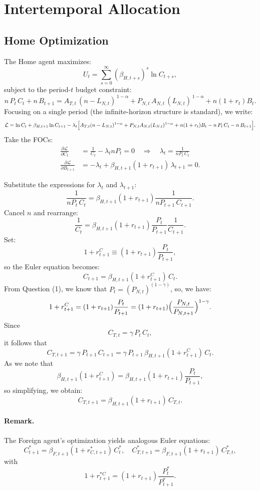 \documentclass[a4paper,12pt]{article} %
\theoremstyle{nonitalic}
\begin{document}
\section{Intertemporal Allocation}

\subsection*{Home Optimization}
The Home agent maximizes:
\[
U_t = \sum_{s=0}^{\infty} (\beta_{H,t+s})^s \ln C_{t+s},
\]
subject to the period-$ t $ budget constraint:
\[
n\,P_t\,C_t + n\,B_{t+1} = A_{T,t}\,(n-L_{N,t})^{\,1-\alpha} + P_{N,t}\,A_{N,t}\,(L_{N,t})^{\,1-\alpha} + n(1+r_t)B_t.
\]
Focusing on a single period (the infinite-horizon structure is standard), we write:
\[
\mathcal{L} = \ln C_t + \beta_{H,t+1}\ln C_{t+1} - \lambda_t \Bigl[A_{T,t}(n-L_{N,t})^{1-\alpha} + P_{N,t}A_{N,t}(L_{N,t})^{1-\alpha} + n(1+r_t)B_t - n\,P_t\,C_t - n\,B_{t+1}\Bigr].
\]
Take the FOCs:
\begin{align*}
    \frac{\partial \mathcal{L}}{\partial C_t} &= \frac{1}{C_t} - \lambda_t nP_t = 0 \quad \Rightarrow \quad \lambda_t = \frac{1}{nP_t\,C_t} \\
    \frac{\partial \mathcal{L}}{\partial B_{t+1}} &= -\lambda_t + \beta_{H,t+1}(1+r_{t+1})\,\lambda_{t+1} = 0.
\end{align*}

Substitute the expressions for \(\lambda_t\) and \(\lambda_{t+1}\):
\[
\frac{1}{nP_t\,C_t} = \beta_{H,t+1}(1+r_{t+1})\frac{1}{nP_{t+1}\,C_{t+1}}.
\]
Cancel \(n\) and rearrange:
\[
\frac{1}{C_t} = \beta_{H,t+1}(1+r_{t+1})\frac{P_t}{P_{t+1}}\frac{1}{C_{t+1}}.
\]
Set:
\[
1 + r_{t+1}^C \equiv (1+r_{t+1})\frac{P_t}{P_{t+1}},
\]
so the Euler equation becomes:
\[
\boxed{C_{t+1} = \beta_{H,t+1}(1+r_{t+1}^C)\, C_t.}
\]
From Question (1), we know that $P_t = (P_{N,t})^{(1-\gamma)}$,
so, we have:
\[
1 + r_{t+1}^C = (1+r_{t+1})\frac{P_t}{P_{t+1}} = (1+r_{t+1})\Bigl(\frac{P_{N,t}}{P_{N,t+1}}\Bigr)^{1-\gamma}.
\]
Since
\[
C_{T,t} = \gamma\,P_t\,C_t,
\]
it follows that
\[
C_{T,t+1} = \gamma\,P_{t+1}\,C_{t+1} = \gamma\,P_{t+1}\,\beta_{H,t+1}(1+r_{t+1}^C)\,C_t.
\]
As we note that
\[
\beta_{H,t+1}(1+r_{t+1}^C) = \beta_{H,t+1}(1+r_{t+1})\frac{P_t}{P_{t+1}},
\]
so simplifying, we obtain:
\[
\boxed{C_{T,t+1} = \beta_{H,t+1}(1+r_{t+1})\, C_{T,t}.}
\]

\paragraph{Remark.}  
The Foreign agent's optimization yields analogous Euler equations:
\[
C^*_{t+1} = \beta_{F,t+1}(1+r^*_{C,t+1})\, C^*_t,\quad
C^*_{T,t+1} = \beta_{F,t+1}(1+r_{t+1})\, C^*_{T,t},
\]
with
\[
1+r_{t+1}^{*C} = (1+r_{t+1})\frac{P^*_t}{P^*_{t+1}}.
\]
\end{document}
